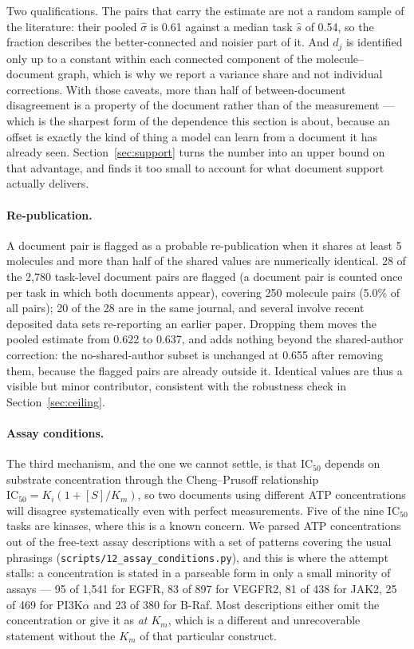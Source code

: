 Two qualifications. The pairs that carry the estimate are not a random sample of the literature: their pooled $\hat\sigma$ is 0.61 against a median task $\hat s$ of 0.54, so the fraction describes the better-connected and noisier part of it. And $d_j$ is identified only up to a constant within each connected component of the molecule--document graph, which is why we report a variance share and not individual corrections. With those caveats, more than half of between-document disagreement is a property of the document rather than of the measurement --- which is the sharpest form of the dependence this section is about, because an offset is exactly the kind of thing a model can learn from a document it has already seen. Section~\ref{sec:support} turns the number into an upper bound on that advantage, and finds it too small to account for what document support actually delivers.

\paragraph{Re-publication.} A document pair is flagged as a probable re-publication when it shares at least 5 molecules and more than half of the shared values are numerically identical. 28 of the 2{,}780 task-level document pairs are flagged (a document pair is counted once per task in which both documents appear), covering 250 molecule pairs (5.0\% of all pairs); 20 of the 28 are in the same journal, and several involve recent deposited data sets re-reporting an earlier paper. Dropping them moves the pooled estimate from 0.622 to 0.637, and adds nothing beyond the shared-author correction: the no-shared-author subset is unchanged at 0.655 after removing them, because the flagged pairs are already outside it. Identical values are thus a visible but minor contributor, consistent with the robustness check in Section~\ref{sec:ceiling}.

\paragraph{Assay conditions.} The third mechanism, and the one we cannot settle, is that $\mathrm{IC}_{50}$ depends on substrate concentration through the Cheng--Prusoff relationship $\mathrm{IC}_{50}=K_i(1+[S]/K_m)$, so two documents using different ATP concentrations will disagree systematically even with perfect measurements. Five of the nine $\mathrm{IC}_{50}$ tasks are kinases, where this is a known concern. We parsed ATP concentrations out of the free-text assay descriptions with a set of patterns covering the usual phrasings (\texttt{scripts/12\_assay\_conditions.py}), and this is where the attempt stalls: a concentration is stated in a parseable form in only a small minority of assays --- 95 of 1{,}541 for EGFR, 83 of 897 for VEGFR2, 81 of 438 for JAK2, 25 of 469 for PI3K$\alpha$ and 23 of 380 for B-Raf. Most descriptions either omit the concentration or give it as \emph{at $K_m$}, which is a different and unrecoverable statement without the $K_m$ of that particular construct.


